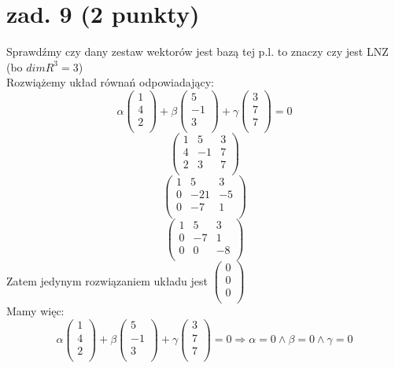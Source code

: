 \documentclass{article}
\begin{document}
\section{zad. 9 (2 punkty)}
Sprawdźmy czy dany zestaw wektorów jest bazą tej p.l. to znaczy czy jest LNZ (bo $dim R^3 = 3$)
\\
Rozwiążemy układ równań odpowiadający:
$$
\alpha\begin{pmatrix}
     1 \\
     4 \\
     2 \\
    \end{pmatrix}
    + \beta
    \begin{pmatrix}
     5 \\
     -1 \\
     3 \\
    \end{pmatrix}
    + \gamma
    \begin{pmatrix}
     3 \\
     7 \\
     7 \\
    \end{pmatrix}
    = 0
$$
$$
\begin{pmatrix}
1 & 5 & 3 \\
4 & -1 & 7 \\
2 & 3 & 7 \\
\end{pmatrix}
$$
$$
\begin{pmatrix}
1 & 5 & 3 \\
0 & -21 & -5 \\
0 & -7 & 1 \\
\end{pmatrix}
$$
$$
\begin{pmatrix}
1 & 5 & 3 \\
0 & -7 & 1 \\
0 & 0 & -8 \\
\end{pmatrix}
$$
Zatem jedynym rozwiązaniem układu jest 
$\begin{pmatrix}
0 \\
0 \\
0 \\
\end{pmatrix}$
\\Mamy więc:
$$
\alpha\begin{pmatrix}
     1 \\
     4 \\
     2 \\
    \end{pmatrix}
    + \beta
    \begin{pmatrix}
     5 \\
     -1 \\
     3 \\
    \end{pmatrix}
    + \gamma
    \begin{pmatrix}
     3 \\
     7 \\
     7 \\
    \end{pmatrix}
    = 0
    \Rightarrow
    \alpha = 0 \wedge \beta = 0 \wedge \gamma = 0
$$
\end{document}
